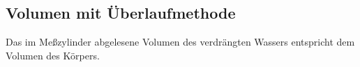 %

\subsection{Volumen mit Überlaufmethode}
Das im Meßzylinder abgelesene Volumen des verdrängten Wassers entspricht dem Volumen des Körpers.

